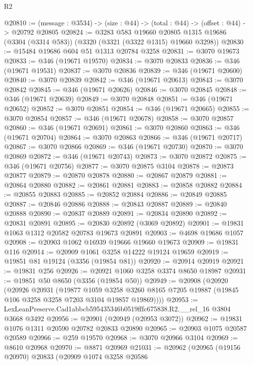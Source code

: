 \begin{lexlean}{R2}
\begin{coremodule}
@20810 := (message : @3534) -> (size : @44) -> (total : @44) -> (offset : @44) -> @20792 @20805
@20824 := @3283
    @583
    @19660
    @20805
    @1315
    @19686
    (@3304 (@3314 @583))
    (@3320 (@3321 (@3322 @1315) @19660 @3298))
@20830 := @15484 @19686 @604 @51 @1313 @20784 @3258
@20831 := @3070 @19673
@20833 := @346 (@19671 @19570)
@20834 := @3070 @20833
@20836 := @346 (@19671 @19531)
@20837 := @3070 @20836
@20839 := @346 (@19671 @20600)
@20840 := @3070 @20839
@20842 := @346 (@19671 @20613)
@20843 := @3070 @20842
@20845 := @346 (@19671 @20626)
@20846 := @3070 @20845
@20848 := @346 (@19671 @20639)
@20849 := @3070 @20848
@20851 := @346 (@19671 @20652)
@20852 := @3070 @20851
@20854 := @346 (@19671 @20665)
@20855 := @3070 @20854
@20857 := @346 (@19671 @20678)
@20858 := @3070 @20857
@20860 := @346 (@19671 @20691)
@20861 := @3070 @20860
@20863 := @346 (@19671 @20704)
@20864 := @3070 @20863
@20866 := @346 (@19671 @20717)
@20867 := @3070 @20866
@20869 := @346 (@19671 @20730)
@20870 := @3070 @20869
@20872 := @346 (@19671 @20743)
@20873 := @3070 @20872
@20875 := @346 (@19671 @20756)
@20877 := @3070 @20875 @3104
@20878 := @20873 @20877
@20879 := @20870 @20878
@20880 := @20867 @20879
@20881 := @20864 @20880
@20882 := @20861 @20881
@20883 := @20858 @20882
@20884 := @20855 @20883
@20885 := @20852 @20884
@20886 := @20849 @20885
@20887 := @20846 @20886
@20888 := @20843 @20887
@20889 := @20840 @20888
@20890 := @20837 @20889
@20891 := @20834 @20890
@20892 := @20831 @20891
@20895 := @20830 @20892 (@3069 @20892)
@20901 := @19831 @1063 @1312 @20582 @20783 @19673 @20891
@20903 := @4698 @19686 @1057
@20908 := @20903 @1062 @16939 @19666 @19660 @19673
@20909 := @19831 @116
@20914 := @20909 @1061 @3258 @14222 @19124 @19659
@20919 := @19851 @81 @19124 (@3356 (@19854 @81))
@20920 := @20914 @20919
@20921 := @19831 @256
@20926 := @20921 @1060 @3258 @3374 @8650 @18987
@20931 := @19851 @50 @8650 (@3356 (@19854 @50))
@20949 := @20908
    (@20920
      (@20926
        @20931
        (@19877
          @1059
          @3258
          @3260
          @8165
          @7205
          @19887
          (@19845 @106 @3258 @3258 @7203 @3104 @19857 @19869))))
@20953 := LexLeanPreserve.Cad1abbcb595435346b0519fffc675838.R2.__rel_16 @3804 @3668 @3492
@20956 := @20901 (@20949 (@20953 @3072))
@20962 := @19831 @1076 @1311 @20590 @20782 @20833 @20890
@20965 := @20903 @1075 @20587 @20589
@20966 := @259 @19570
@20968 := @3070 @20966 @3104
@20969 := @8610 @20968
@20970 := @8871 @20969
@21031 := @20962
    (@20965
      (@19156 @20970)
      @20833
      (@20909
        @1074
        @3258
        @20586

\end{coremodule}
\end{lexlean}

